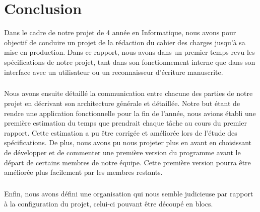 \chapter{Conclusion}

Dans le cadre de notre projet de 4 année en Informatique, nous avons
pour objectif de conduire un projet de la rédaction du cahier des charges
jusqu’à sa mise en production. Dans ce rapport, nous avons dans un premier
temps revu les spécifications de notre projet, tant dans son fonctionnement
interne que dans son interface avec un utilisateur ou un reconnaisseur
d’écriture manuscrite.

\paragraph{}
Nous avons ensuite détaillé la communication entre chacune des parties de
notre projet en décrivant son architecture générale et détaillée. Notre but
étant de rendre une application fonctionnelle pour la fin de l’année, nous
avions établi une première estimation du temps que prendrait chaque tâche
au cours du premier rapport. Cette estimation a pu être corrigée et améliorée
lors de l’étude des spécifications. De plus, nous avons pu nous projeter plus
en avant en choisissant de développer et de commenter une première version du
programme avant le départ de certains membres de notre équipe. Cette première
version pourra être améliorée plus facilement par les membres restants.

\paragraph{}
Enfin, nous avons défini une organisation qui nous semble judicieuse par
rapport à la configuration du projet, celui-ci pouvant être découpé en blocs.

